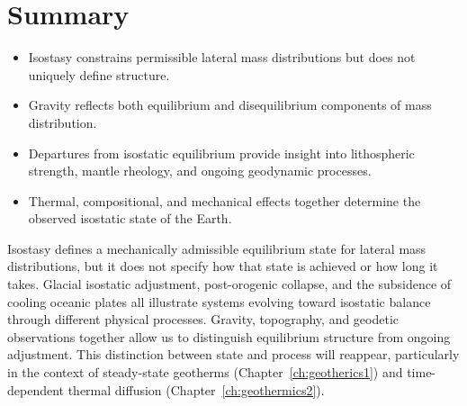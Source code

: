 \section{Summary}
\begin{itemize}
  \item Isostasy constrains permissible lateral mass distributions but does not uniquely define structure.
  \item Gravity reflects both equilibrium and disequilibrium components of mass distribution.
  \item Departures from isostatic equilibrium provide insight into lithospheric strength, mantle rheology, and ongoing geodynamic processes.
  \item Thermal, compositional, and mechanical effects together determine the observed isostatic state of the Earth.
\end{itemize}

Isostasy defines a mechanically admissible equilibrium state for lateral mass distributions, but it does not specify how that state is achieved or how long it takes.  Glacial isostatic adjustment, post-orogenic collapse, and the subsidence of cooling oceanic plates all illustrate systems evolving toward isostatic balance through different physical processes.  Gravity, topography, and geodetic observations together allow us to distinguish equilibrium structure from ongoing adjustment.  This distinction between state and process will reappear, particularly in the context of steady-state geotherms (Chapter~\ref{ch:geotherics1}) and time-dependent thermal diffusion (Chapter~\ref{ch:geothermics2}).

